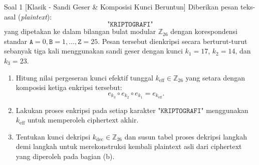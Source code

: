 \documentclass[11pt,a4paper]{article}
\begin{document}
\begin{soalklasik}{Soal 1 [Klasik - Sandi Geser \& Komposisi Kunci Beruntun]}
Diberikan pesan teks-asal (\textit{plaintext}):
\[
\texttt{"KRIPTOGRAFI"}
\]
yang dipetakan ke dalam bilangan bulat modular $\mathbb{Z}_{26}$ dengan korespondensi standar $\texttt{A}=0, \texttt{B}=1, \dots, \texttt{Z}=25$. Pesan tersebut dienkripsi secara berturut-turut sebanyak tiga kali menggunakan sandi geser dengan kunci $k_1 = 17$, $k_2 = 14$, dan $k_3 = 23$.
\begin{enumerate}[label=(\alph*)]
    \item Hitung nilai pergeseran kunci efektif tunggal $k_{\text{eff}} \in \mathbb{Z}_{26}$ yang setara dengan komposisi ketiga enkripsi tersebut:
    \[
    e_{k_3} \circ e_{k_2} \circ e_{k_1} = e_{k_{\text{eff}}}.
    \]
    \item Lakukan proses enkripsi pada setiap karakter $\texttt{"KRIPTOGRAFI"}$ menggunakan $k_{\text{eff}}$ untuk memperoleh ciphertext akhir.
    \item Tentukan kunci dekripsi $k_{\text{dec}} \in \mathbb{Z}_{26}$ dan susun tabel proses dekripsi langkah demi langkah untuk merekonstruksi kembali plaintext asli dari ciphertext yang diperoleh pada bagian (b).
\end{enumerate}
\end{soalklasik}
\end{document}

